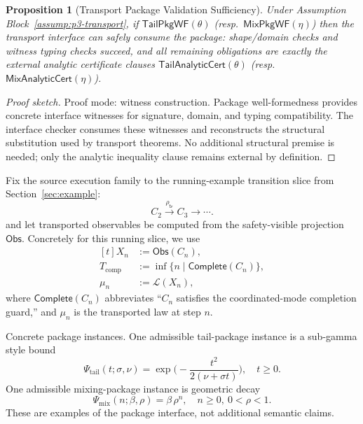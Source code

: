 \documentclass[a4paper,10pt,twocolumn,english]{article}
\numberwithin{equation}{section}
\theoremstyle{paperdef}
\theoremstyle{paperplain}
\newtheorem{proposition}[definition]{Proposition}
\theoremstyle{paperdef}
\theoremstyle{paperremark}
\theoremstyle{paperdef}
\newcommand{\Obs}{\ensuremath{\mathsf{Obs}}}
\begin{document}
\begin{proposition}[Transport Package Validation Sufficiency]
	\label{prop:p3-transport-pkg-validation}
	Under Assumption Block~\ref{assump:p3-transport}, if
	$\mathsf{TailPkgWF}(\theta)$ (resp.\ $\mathsf{MixPkgWF}(\eta)$) then the
	transport interface can safely consume the package: shape/domain checks and
	witness typing checks succeed, and all remaining obligations are exactly the
	external analytic certificate clauses
	$\mathsf{TailAnalyticCert}(\theta)$ (resp.\ $\mathsf{MixAnalyticCert}(\eta)$).
\end{proposition}

\begin{proof}[Proof sketch]
	Proof mode: witness construction. Package well-formedness provides concrete
	interface witnesses for signature, domain, and typing compatibility. The
	interface checker consumes these witnesses and reconstructs the structural
	substitution used by transport theorems. No additional structural premise is
	needed; only the analytic inequality clause remains external by definition.
\end{proof}

Fix the source execution family to the running-example transition slice from Section~\ref{sec:example}:
\begin{equation}
	C_2 \xrightarrow{\rho_{\mathsf{tr}}} C_3 \xrightarrow{} \cdots.
\end{equation}
and let transported observables be computed from the safety-visible projection $\Obs$.
Concretely for this running slice, we use
\begin{equation}
	\begin{aligned}[t]
		X_n   & := \Obs(C_n),                             \\
		T_{\mathrm{comp}}
		      & := \inf\{n \mid \mathsf{Complete}(C_n)\}, \\
		\mu_n & := \mathcal{L}(X_n),
	\end{aligned}
\end{equation}
where $\mathsf{Complete}(C_n)$ abbreviates ``$C_n$ satisfies the coordinated-mode completion guard,'' and $\mu_n$ is the transported law at step $n$.

Concrete package instances. One admissible tail-package instance is a
sub-gamma style bound
\[
	\Psi_{\mathrm{tail}}(t;\sigma,\nu)=
	\exp\!\Big(\!-\frac{t^2}{2(\nu+\sigma t)}\Big),\quad t\ge 0.
\]
One admissible mixing-package instance is geometric decay
\[
	\Psi_{\mathrm{mix}}(n;\beta,\rho)=\beta\,\rho^n,\quad n\ge 0,\ 0<\rho<1.
\]
These are examples of the package interface, not additional semantic claims.
\end{document}
